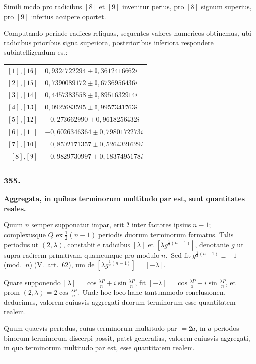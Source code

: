 \documentclass[12pt,a4paper]{article}
\theoremstyle{plain}
\theoremstyle{definition}
\theoremstyle{remark}
\begin{document}
Simili modo pro radicibus $[8]$ et $[9]$ invenitur perius, pro $[8]$
signum superius, pro $[9]$ inferius accipere oportet.

Computando perinde radices reliquas, sequentes valores numericos
obtinemus, ubi radicibus prioribus signa superiora, posterioribus inferiora
respondere subintelligendum est:

\begin{center}
\begin{tabular}{r@{ $=$ }l}
$[1]$,$[16]$ & $0,9324722294\pm 0,3612416662i$ \\
$[2]$,$[15]$ & $0,7390089172\pm 0,6736956436i$ \\
$[3]$,$[14]$ & $0,4457383558\pm 0,8951632914i$ \\
$[4]$,$[13]$ & $0,0922683595\pm 0,9957341763i$ \\
$[5]$,$[12]$ & $-0,273662990\pm 0,9618256432i$ \\
$[6]$,$[11]$ & $-0,6026346364\pm 0,7980172273i$ \\
$[7]$,$[10]$ & $-0,8502171357\pm 0,5264321629i$ \\
$[8]$,$[9]$  & $-0,9829730997\pm 0,1837495178i$
\end{tabular}
\end{center}

\subsubsection*{355.}

\textbf{Aggregata, in quibus terminorum multitudo par est, sunt quantitates
reales.}

Quum $n$ semper supponatur impar, erit 2 inter factores ipsius $n-1$;
complexusque $Q$ ex $\frac{1}{2}(n-1)$ periodis duorum terminorum formatus.
Talis periodus ut $(2,\lambda)$, constabit e radicibus $[\lambda]$ et
$[\lambda g^{\frac{1}{2}(n-1)}]$, denotante $g$ ut supra radicem primitivam quamcunque
pro modulo $n$.\ Sed fit $g^{\frac{1}{2}(n-1)}\equiv -1$ (mod.\ $n$) (V.\ art.\ 62),
um de $[\lambda g^{\frac{1}{2}(n-1)}] = [-\lambda]$.

Quare supponendo $[\lambda] = \cos\frac{\lambda P}{n}+i\sin\frac{\lambda P}{n}$, fit
$[-\lambda] = \cos\frac{\lambda P}{n}-i\sin\frac{\lambda P}{n}$, et proin $(2,\lambda) =
2\cos\frac{\lambda P}{n}$.\ Unde hoc loco hanc tantummodo conclusionem deducimus,
valorem cuiusvis aggregati duorum terminorum esse quantitatem realem.

Quum quaevis periodus, cuius terminorum multitudo par $=2a$, in $a$
periodos binorum terminorum discerpi possit, patet generalius, valorem
cuiusvis aggregati, in quo terminorum multitudo par est, esse quantitatem
realem.

\vspace{1cm}
\begin{center}
\rule{0.5\textwidth}{0.4pt}
\end{center}
\end{document}
